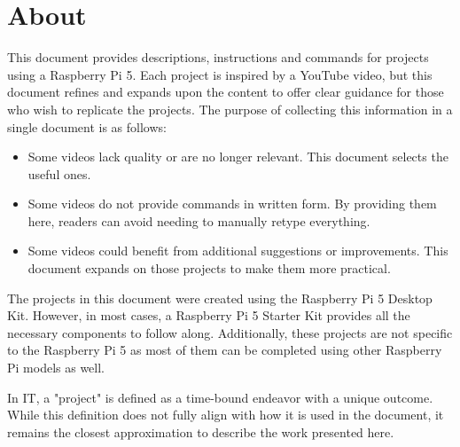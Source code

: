 \section*{About}  

This document provides descriptions, instructions and commands for projects using a Raspberry Pi 5. Each project is inspired by a YouTube video, but this document refines and expands upon the content to offer clear guidance for those who wish to replicate the projects. The purpose of collecting this information in a single document is as follows:

\begin{itemize}
\item Some videos lack quality or are no longer relevant. This document selects the useful ones.
\item Some videos do not provide commands in written form. By providing them here, readers can avoid needing to manually retype everything.
\item Some videos could benefit from additional suggestions or improvements. This document expands on those projects to make them more practical.
\end{itemize}

The projects in this document were created using the Raspberry Pi 5 Desktop Kit. However, in most cases, a Raspberry Pi 5 Starter Kit provides all the necessary components to follow along. Additionally, these projects are not specific to the Raspberry Pi 5 as most of them can be completed using other Raspberry Pi models as well.  

In IT, a "project" is defined as a time-bound endeavor with a unique outcome. While this definition does not fully align with how it is used in the document, it remains the closest approximation to describe the work presented here.